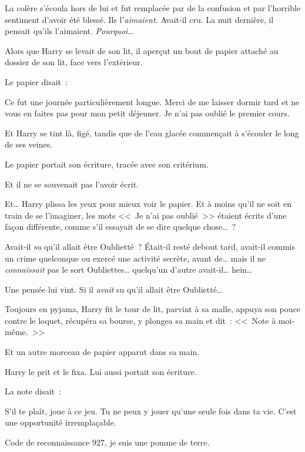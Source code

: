La colère s'écoula hors de lui et fut remplacée par de la confusion et par l'horrible sentiment d'avoir été blessé. Ils l'\emph{aimaient}. Avait-il cru. La nuit dernière, il pensait qu'ils l'aimaient. \emph{Pourquoi…}

Alors que Harry se levait de son lit, il aperçut un bout de papier attaché au dossier de son lit, face vers l'extérieur.

Le papier disait~:

\begin{writtenNote}

Ce fut une journée particulièrement longue. Merci de me laisser dormir tard et ne vous en faites pas pour mon petit déjeuner. Je n'ai pas oublié le premier cours.

\end{writtenNote}

Et Harry se tint là, figé, tandis que de l'eau glacée commençait à s'écouler le long de ses veines.

Le papier portait son écriture, tracée avec son critérium.

Et il ne se souvenait pas l'avoir écrit.

Et… Harry plissa les yeux pour mieux voir le papier. Et à moins qu'il ne soit en train de se l'imaginer, les mots <<~Je n'ai pas oublié~>> étaient écrits d'une façon différente, comme s'il essayait de se dire quelque chose…~?

Avait-il \emph{su} qu'il allait être Oublietté~? Était-il resté debout tard, avait-il commis un crime quelconque ou exercé une activité secrète, avant de… mais il ne \emph{connaissait} pas le sort Oubliettes… quelqu'un d'autre avait-il… hein…

Une pensée lui vint. Si il \emph{avait} su qu'il allait être Oublietté…

Toujours en pyjama, Harry fit le tour de lit, parvint à sa malle, appuya son pouce contre le loquet, récupéra sa bourse, y plongea sa main et dit~: <<~Note à moi-même.~>>

Et un autre morceau de papier apparut dans sa main.

Harry le prit et le fixa. Lui aussi portait son écriture.

La note disait~:

\begin{writtenNote}

S'il te plaît, joue à ce jeu. Tu ne peux y jouer qu'une seule fois dans ta vie. C'est une opportunité irremplaçable.

Code de reconnaissance 927, je suis une pomme de terre.

\end{writtenNote}

